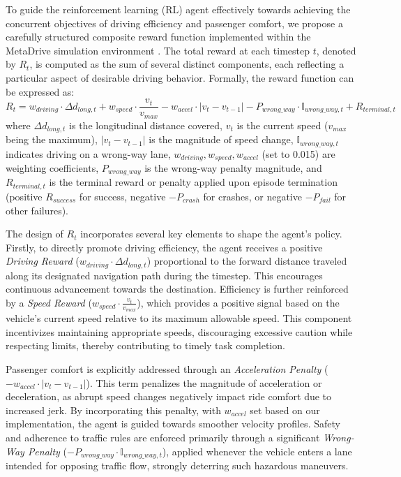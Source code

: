 \documentclass[12pt,a4paper]{article}
\begin{document}
To guide the reinforcement learning (RL) agent effectively towards achieving the concurrent objectives of driving efficiency and passenger comfort, we propose a carefully structured composite reward function implemented within the MetaDrive simulation environment \cite{metadrive}. The total reward at each timestep \( t \), denoted by \( R_t \), is computed as the sum of several distinct components, each reflecting a particular aspect of desirable driving behavior. Formally, the reward function can be expressed as:
\[
R_t = w_{driving} \cdot \Delta d_{long, t} + w_{speed} \cdot \frac{v_t}{v_{max}} - w_{accel} \cdot |v_t - v_{t-1}| - P_{wrong\_way} \cdot \mathbb{I}_{wrong\_way, t} + R_{terminal, t}
\]
where \( \Delta d_{long, t} \) is the longitudinal distance covered, \( v_t \) is the current speed (\( v_{max} \) being the maximum), \( |v_t - v_{t-1}| \) is the magnitude of speed change, \( \mathbb{I}_{wrong\_way, t} \) indicates driving on a wrong-way lane, \( w_{driving}, w_{speed}, w_{accel} \) (set to 0.015) are weighting coefficients, \( P_{wrong\_way} \) is the wrong-way penalty magnitude, and \( R_{terminal, t} \) is the terminal reward or penalty applied upon episode termination (positive \( R_{success} \) for success, negative \( -P_{crash} \) for crashes, or negative \( -P_{fail} \) for other failures).

The design of \( R_t \) incorporates several key elements to shape the agent's policy. Firstly, to directly promote driving efficiency, the agent receives a positive \textit{Driving Reward} (\( w_{driving} \cdot \Delta d_{long, t} \)) proportional to the forward distance traveled along its designated navigation path during the timestep. This encourages continuous advancement towards the destination. Efficiency is further reinforced by a \textit{Speed Reward} (\( w_{speed} \cdot \frac{v_t}{v_{max}} \)), which provides a positive signal based on the vehicle's current speed relative to its maximum allowable speed. This component incentivizes maintaining appropriate speeds, discouraging excessive caution while respecting limits, thereby contributing to timely task completion.

Passenger comfort is explicitly addressed through an \textit{Acceleration Penalty} (\( -w_{accel} \cdot |v_t - v_{t-1}| \)). This term penalizes the magnitude of acceleration or deceleration, as abrupt speed changes negatively impact ride comfort due to increased jerk. By incorporating this penalty, with \( w_{accel} \) set based on our implementation, the agent is guided towards smoother velocity profiles. Safety and adherence to traffic rules are enforced primarily through a significant \textit{Wrong-Way Penalty} (\( -P_{wrong\_way} \cdot \mathbb{I}_{wrong\_way, t} \)), applied whenever the vehicle enters a lane intended for opposing traffic flow, strongly deterring such hazardous maneuvers.
\end{document}
